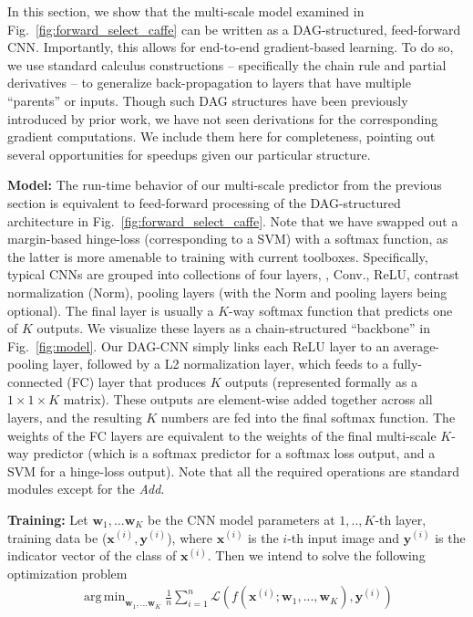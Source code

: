 \documentclass[10pt,twocolumn,letterpaper]{article}
\DeclareMathOperator*{\argmin}{arg\,min}
\begin{document}
In this section, we show that the multi-scale model examined in Fig.~\ref{fig:forward_select_caffe} can be written as a DAG-structured, feed-forward CNN. Importantly, this allows for end-to-end gradient-based learning. To do so, we use standard calculus constructions -- specifically the chain rule and partial derivatives -- to generalize back-propagation to layers that have multiple ``parents'' or inputs. Though such DAG structures have been previously introduced by prior work, we have not seen derivations for the corresponding gradient computations. We include them here for completeness, pointing out several opportunities for speedups given our particular structure.

{\bf Model:} The run-time behavior of our multi-scale predictor from the previous section is equivalent to feed-forward processing of the DAG-structured architecture in Fig.~\ref{fig:forward_select_caffe}. Note that we have swapped out a margin-based hinge-loss (corresponding to a SVM) with a softmax function, as the latter is more amenable to training with current toolboxes. Specifically, typical CNNs are grouped into collections of four layers, \ie, Conv., ReLU, contrast normalization (Norm), pooling layers (with the Norm and pooling layers being optional). The final layer is usually a $K$-way softmax function that predicts one of $K$ outputs. We visualize these layers as a chain-structured ``backbone'' in Fig.~\ref{fig:model}. Our DAG-CNN simply links each ReLU layer to an average-pooling layer, followed by a L2 normalization layer, which feeds to a fully-connected (FC) layer that produces $K$ outputs (represented formally as a $1 \times 1 \times K$ matrix). These outputs are element-wise added together across all layers, and the resulting $K$ numbers are fed into the final softmax function. The weights of the FC layers are equivalent to the weights of the final multi-scale $K$-way predictor (which is a softmax predictor for a softmax loss output, and a SVM for a hinge-loss output). Note that all the required operations are standard modules except for the \textit{Add}.


{\bf Training:} Let $\textbf{w}_1,...\textbf{w}_K$ be the CNN model parameters at $1,..,K$-th layer, training data be ($\textbf{x}^{(i)},\textbf{y}^{(i)}$), where $\textbf{x}^{(i)}$ is the $i$-th input image and $\textbf{y}^{(i)}$ is the indicator vector of the class of $\textbf{x}^{(i)}$. Then we intend to solve the following optimization problem
\vspace{-5pt}
\begin{align}
\argmin_{\textbf{w}_1,...\textbf{w}_K} \frac{1}{n}\sum_{i=1}^{n} \mathcal{L}(f(\textbf{x}^{(i)};\textbf{w}_1,...,\textbf{w}_K),\textbf{y}^{(i)})
\end{align}
\end{document}
